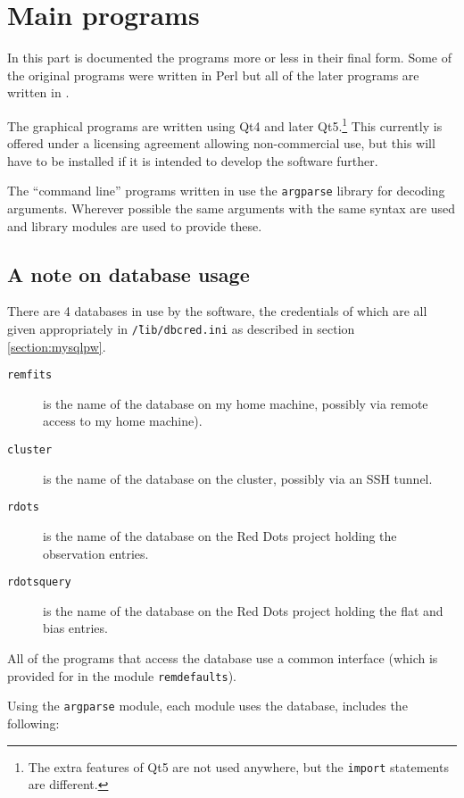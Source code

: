 \section{Main programs}
\protect\label{section:mainprogs}

In this part is documented the programs more or less in their final form. Some
of the original programs were written in Perl but all of the later programs are
written in \py.

The graphical programs are written using Qt4 and later Qt5.\footnote{The extra
features of Qt5 are not used anywhere, but the {\py} \texttt{import} statements
are different.} This currently is offered under a licensing agreement allowing
non-commercial use, but this will have to be installed if it is intended to
develop the software further.

The ``command line'' programs written in {\py} use the \texttt{argparse} library
for decoding arguments. Wherever possible the same arguments with the same
syntax are used and library modules are used to provide these.

\subsection{A note on database usage}
\protect\label{section:databaseusage}

There are 4 databases in use by the software, the credentials of which are all
given appropriately in \texttt{\~/lib/dbcred.ini} as described in section
\ref{section:mysqlpw}.

\begin{description}
\item[\tt remfits] is the name of the database on my home machine, possibly via
remote access to my home machine).
\item[\tt cluster] is the name of the database on the cluster, possibly via an
SSH tunnel.
\item[\tt rdots] is the name of the database on the Red Dots project holding the
observation entries.
\item[\tt rdotsquery] is the name of the database on the Red Dots project
holding the flat and bias entries.
\end{description}

All of the programs that access the database use a common interface (which is
provided for in the module \texttt{remdefaults}).

Using the \texttt{argparse} module, each module uses the database, includes the
following:

